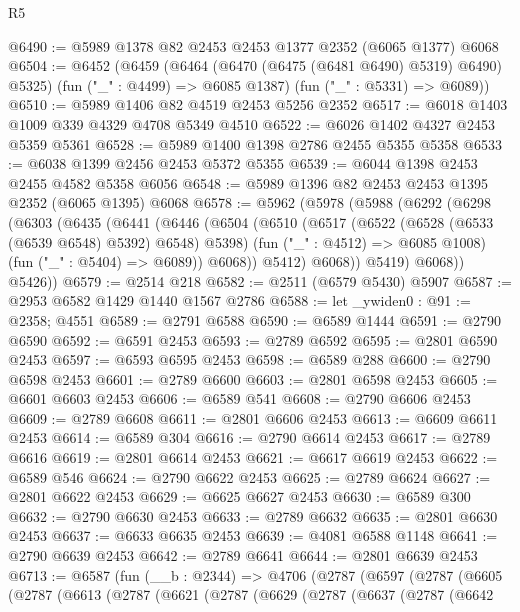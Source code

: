 \begin{lexlean}{R5}
\begin{coremodule}
@6490 := @5989 @1378 @82 @2453 @2453 @1377 @2352 (@6065 @1377) @6068
@6504 := @6452
    (@6459
      (@6464 (@6470 (@6475 (@6481 @6490) @5319) @6490) @5325)
      (fun ("_" : @4499) => @6085 @1387)
      (fun ("_" : @5331) => @6089))
@6510 := @5989 @1406 @82 @4519 @2453 @5256 @2352
@6517 := @6018 @1403 @1009 @339 @4329 @4708 @5349 @4510
@6522 := @6026 @1402 @4327 @2453 @5359 @5361
@6528 := @5989 @1400 @1398 @2786 @2455 @5355 @5358
@6533 := @6038 @1399 @2456 @2453 @5372 @5355
@6539 := @6044 @1398 @2453 @2455 @4582 @5358 @6056
@6548 := @5989 @1396 @82 @2453 @2453 @1395 @2352 (@6065 @1395) @6068
@6578 := @5962
    (@5978
      (@5988
        (@6292
          (@6298
            (@6303
              (@6435
                (@6441
                  (@6446
                    (@6504
                      (@6510
                        (@6517
                          (@6522 (@6528 (@6533 (@6539 @6548) @5392) @6548) @5398)
                          (fun ("_" : @4512) => @6085 @1008)
                          (fun ("_" : @5404) => @6089))
                        @6068))
                    @5412)
                  @6068))
              @5419)
            @6068))
        @5426))
@6579 := @2514 @218
@6582 := @2511 (@6579 @5430) @5907
@6587 := @2953 @6582 @1429 @1440 @1567 @2786
@6588 := let _ywiden0 : @91 := @2358; @4551
@6589 := @2791 @6588
@6590 := @6589 @1444
@6591 := @2790 @6590
@6592 := @6591 @2453
@6593 := @2789 @6592
@6595 := @2801 @6590 @2453
@6597 := @6593 @6595 @2453
@6598 := @6589 @288
@6600 := @2790 @6598 @2453
@6601 := @2789 @6600
@6603 := @2801 @6598 @2453
@6605 := @6601 @6603 @2453
@6606 := @6589 @541
@6608 := @2790 @6606 @2453
@6609 := @2789 @6608
@6611 := @2801 @6606 @2453
@6613 := @6609 @6611 @2453
@6614 := @6589 @304
@6616 := @2790 @6614 @2453
@6617 := @2789 @6616
@6619 := @2801 @6614 @2453
@6621 := @6617 @6619 @2453
@6622 := @6589 @546
@6624 := @2790 @6622 @2453
@6625 := @2789 @6624
@6627 := @2801 @6622 @2453
@6629 := @6625 @6627 @2453
@6630 := @6589 @300
@6632 := @2790 @6630 @2453
@6633 := @2789 @6632
@6635 := @2801 @6630 @2453
@6637 := @6633 @6635 @2453
@6639 := @4081 @6588 @1148
@6641 := @2790 @6639 @2453
@6642 := @2789 @6641
@6644 := @2801 @6639 @2453
@6713 := @6587
    (fun (__b : @2344) =>
    @4706
      (@2787
        (@6597
          (@2787
            (@6605
              (@2787
                (@6613
                  (@2787
                    (@6621
                      (@2787
                        (@6629
                          (@2787
                            (@6637
                              (@2787
                                (@6642

\end{coremodule}
\end{lexlean}
